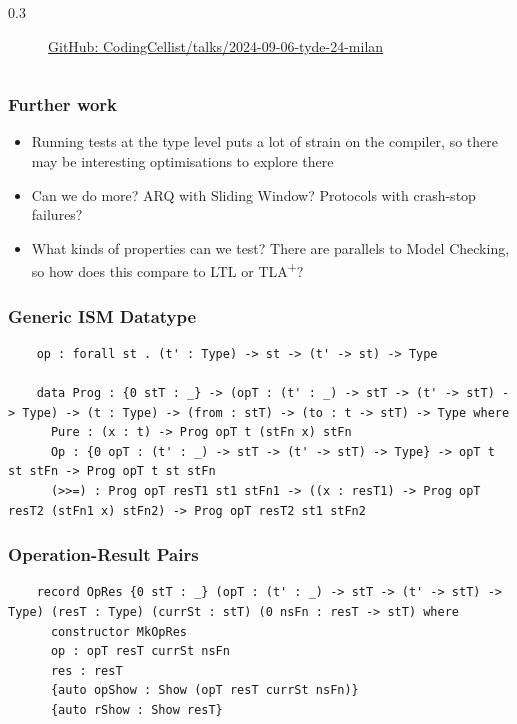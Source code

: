 \documentclass[compress,handout]{beamer}
\begin{document}
\begin{frame}
\begin{columns}
\begin{column}{0.3\framewidth}
\begin{center}
\begin{figure}
      \href{https://github.com/CodingCellist/tyde-24-code}{GitHub: CodingCellist/talks/2024-09-06-tyde-24-milan}\vspace*{3mm}
      \end{figure}
    \end{center}
  \end{column}
  \end{columns}

\end{frame}


\begin{frame}
  \frametitle{Further work}

  \begin{itemize}
    \item<1-> Running tests at the type level puts a lot of strain on the
              compiler, so there may be interesting optimisations to explore
              there
    \item<2-> Can we do more? ARQ with Sliding Window? Protocols with crash-stop
              failures?
    \item<3-> What kinds of properties can we test? There are parallels to Model
              Checking, so how does this compare to LTL or
              TLA\textsuperscript{+}?
  \end{itemize}

\end{frame}


\begin{frame}[fragile]
  \frametitle{Generic ISM Datatype}

  \begin{verbatim}
    op : forall st . (t' : Type) -> st -> (t' -> st) -> Type

    data Prog : {0 stT : _} -> (opT : (t' : _) -> stT -> (t' -> stT) -> Type) -> (t : Type) -> (from : stT) -> (to : t -> stT) -> Type where
      Pure : (x : t) -> Prog opT t (stFn x) stFn
      Op : {0 opT : (t' : _) -> stT -> (t' -> stT) -> Type} -> opT t st stFn -> Prog opT t st stFn
      (>>=) : Prog opT resT1 st1 stFn1 -> ((x : resT1) -> Prog opT resT2 (stFn1 x) stFn2) -> Prog opT resT2 st1 stFn2
  \end{verbatim}

\end{frame}


\begin{frame}[fragile]
  \frametitle{Operation-Result Pairs}

  \begin{verbatim}
    record OpRes {0 stT : _} (opT : (t' : _) -> stT -> (t' -> stT) -> Type) (resT : Type) (currSt : stT) (0 nsFn : resT -> stT) where
      constructor MkOpRes
      op : opT resT currSt nsFn
      res : resT
      {auto opShow : Show (opT resT currSt nsFn)}
      {auto rShow : Show resT}
  \end{verbatim}

\end{frame}
\end{document}
